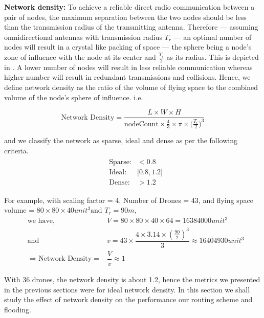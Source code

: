 \textbf{Network density:} To achieve a reliable direct radio communication between a pair of nodes, the maximum separation between the two nodes should be less than the transmission radius of the transmitting antenna. Therefore --- assuming omnidirectional antennas with transmission radius $T_r$ --- an optimal number of nodes will result in a crystal like packing of space --- the sphere being a node's zone of influence with the node at its center and $\frac{T_r}{2}$ as its radius. This is depicted in . A lower number of nodes will result in less reliable communication whereas higher number will result in redundant transmissions and collisions. Hence, we define network density as the ratio of the volume of flying space to the combined volume of the node's sphere of influence. i.e. 

\begin{equation}
    \text{Network Density} = \dfrac{L \times W \times H}{ \text{nodeCount} \times \frac{4}{3} \times \pi \times \big(\frac{T_r}{2} \big)^3}
\end{equation}

and we classify the network as sparse, ideal and dense as per the following criteria.
\begin{eqnarray} \label{node_density}
\begin{aligned}
& \text{Sparse:} & < 0.8 \\
& \text{Ideal:} & \big[0.8, 1.2 \big]  \\
& \text{Dense:} & > 1.2
\end{aligned}
\end{eqnarray}

For example, with scaling factor = 4, Number of Drones = 43, and flying space volume = $ 80 \times 80 \times 40 unit^3  \text{and } T_r = 90 m $,
\begin{eqnarray*}
& \text{we have,} & V = 80 \times 80 \times 40 \times 64 = 16384000 unit^3 \\
& \text{and} & v = 43 \times \dfrac{4 \times 3.14 \times (\frac{90}{2}) ^ 3}{3} \approx 16404930 unit ^ 3 \\
& \Rightarrow \text{Network Density} = & \dfrac{V}{v} \approx 1
\end{eqnarray*}

With 36 drones, the network density is about 1.2, hence the metrics we presented in the previous sections were for ideal network density. In this section we shall study the effect of network density on the performance our routing scheme and flooding.

